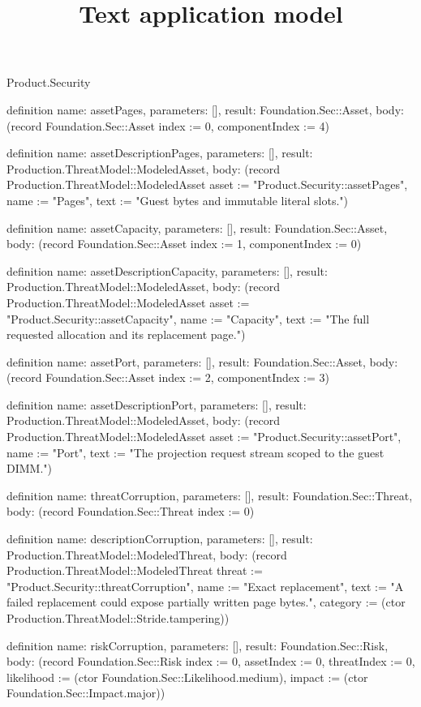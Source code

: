 \begin{lexlean}{Product.Security}
\title{Text application model}
\begin{semanticmodule}
definition{
  name: assetPages, parameters: [], result: Foundation.Sec::Asset,
  body: (record Foundation.Sec::Asset {index := 0, componentIndex := 4})
}

definition{
  name: assetDescriptionPages, parameters: [], result: Production.ThreatModel::ModeledAsset,
  body: (record Production.ThreatModel::ModeledAsset {asset := "Product.Security::assetPages", name := "Pages", text := "Guest bytes and immutable literal slots."})
}

definition{
  name: assetCapacity, parameters: [], result: Foundation.Sec::Asset,
  body: (record Foundation.Sec::Asset {index := 1, componentIndex := 0})
}

definition{
  name: assetDescriptionCapacity, parameters: [], result: Production.ThreatModel::ModeledAsset,
  body: (record Production.ThreatModel::ModeledAsset {asset := "Product.Security::assetCapacity", name := "Capacity", text := "The full requested allocation and its replacement page."})
}

definition{
  name: assetPort, parameters: [], result: Foundation.Sec::Asset,
  body: (record Foundation.Sec::Asset {index := 2, componentIndex := 3})
}

definition{
  name: assetDescriptionPort, parameters: [], result: Production.ThreatModel::ModeledAsset,
  body: (record Production.ThreatModel::ModeledAsset {asset := "Product.Security::assetPort", name := "Port", text := "The projection request stream scoped to the guest DIMM."})
}

definition{
  name: threatCorruption, parameters: [], result: Foundation.Sec::Threat,
  body: (record Foundation.Sec::Threat {index := 0})
}

definition{
  name: descriptionCorruption, parameters: [], result: Production.ThreatModel::ModeledThreat,
  body: (record Production.ThreatModel::ModeledThreat {threat := "Product.Security::threatCorruption", name := "Exact replacement", text := "A failed replacement could expose partially written page bytes.", category := (ctor Production.ThreatModel::Stride.tampering)})
}

definition{
  name: riskCorruption, parameters: [], result: Foundation.Sec::Risk,
  body: (record Foundation.Sec::Risk {index := 0, assetIndex := 0, threatIndex := 0, likelihood := (ctor Foundation.Sec::Likelihood.medium), impact := (ctor Foundation.Sec::Impact.major)})
}


\end{semanticmodule}
\end{lexlean}
